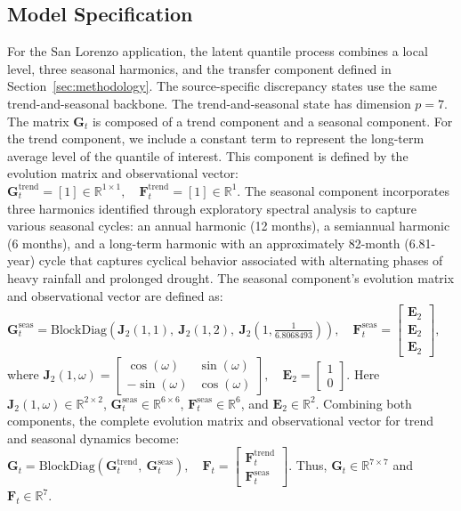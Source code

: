 \documentclass[APA,STIX1COL]{WileyNJD-v2}
\begin{document}
\subsection{Model Specification}
\label{subsec:specification}

For the San Lorenzo application, the latent quantile process combines a local level, three seasonal harmonics, and the transfer component defined in Section~\ref{sec:methodology}. The source-specific discrepancy states use the same trend-and-seasonal backbone. The trend-and-seasonal state has dimension \(p=7\). The matrix \(\mathbf{G}_t\) is composed of a trend component and a seasonal component. For the trend component, we include a constant term to represent the long-term average level of the quantile of interest. This component is defined by the evolution matrix and observational vector:
\( \mathbf{G}^{\text{trend}}_t = [1] \in \mathbb{R}^{1\times1}, \quad
\mathbf{F}^{\text{trend}}_t = [1] \in \mathbb{R}^{1}. \) The seasonal component incorporates three harmonics identified through exploratory spectral analysis to capture various seasonal cycles: an annual harmonic (12 months), a semiannual harmonic (6 months), and a long-term harmonic with an approximately 82-month (6.81-year) cycle that captures cyclical behavior associated with alternating phases of heavy rainfall and prolonged drought. The seasonal component's evolution matrix and observational vector are defined as:
\( \mathbf{G}^{\text{seas}}_t = \text{BlockDiag}\left(\textbf{J}_2(1,1),\ \textbf{J}_2(1,2),\ \textbf{J}_2\left(1,\frac{1}{6.8068493}\right)\right),\quad
\mathbf{F}^{\text{seas}}_t  =
\begin{bmatrix}
\mathbf{E}_2 \\[5pt]
\mathbf{E}_2 \\[5pt]
\mathbf{E}_2
\end{bmatrix}, \)
where
\( \textbf{J}_2(1,\omega) =
\begin{bmatrix}
\cos(\omega) & \sin(\omega) \\[5pt]
-\sin(\omega) & \cos(\omega)
\end{bmatrix},\quad
\mathbf{E}_2 =
\begin{bmatrix}
1 \\[5pt]
0
\end{bmatrix}. \)
Here \(\textbf{J}_2(1,\omega) \in \mathbb{R}^{2\times2}\), \(\mathbf{G}^{\text{seas}}_t \in \mathbb{R}^{6\times6}\), \(\mathbf{F}^{\text{seas}}_t \in \mathbb{R}^{6}\), and \(\mathbf{E}_2 \in \mathbb{R}^{2}\). Combining both components, the complete evolution matrix and observational vector for trend and seasonal dynamics become:
\(
\mathbf{G}_t = \text{BlockDiag}\left(\mathbf{G}^{\text{trend}}_t,\ \mathbf{G}^{\text{seas}}_t\right),\quad
\mathbf{F}_t =
\begin{bmatrix}
\mathbf{F}^{\text{trend}}_t \\[5pt]
\mathbf{F}^{\text{seas}}_t
\end{bmatrix}.
\) Thus, \(\mathbf{G}_t \in \mathbb{R}^{7\times7}\) and \(\mathbf{F}_t \in \mathbb{R}^{7}\).
\end{document}
